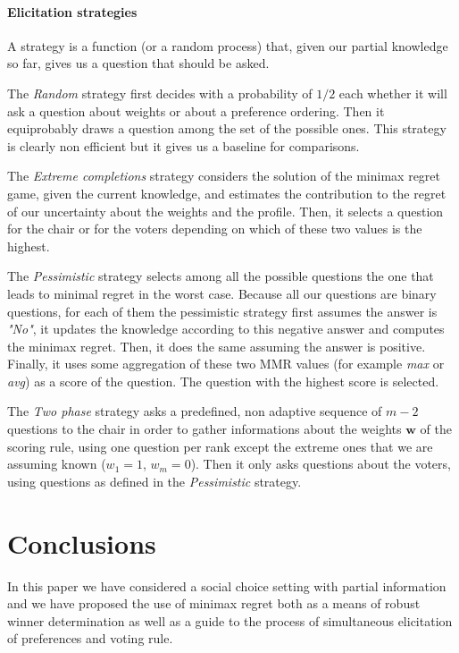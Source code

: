 \documentclass[a4paper,twoside]{article}
\newcommand{\w}{\bm{w}}
\newcommand{\strat}[1]{\emph{#1}}
\begin{document}
\paragraph{Elicitation strategies}
A strategy is a function (or a random process) that, given our partial knowledge so far, gives us a question that should be asked. 

The \strat{Random} strategy first decides with a probability of $1/2$ each whether it will ask a question about weights or about a preference ordering. Then it equiprobably draws a question among the set of the possible ones. This strategy is clearly non efficient but it gives us a baseline for comparisons.

The \strat{Extreme completions} strategy considers the solution of the minimax regret game, given the current knowledge, and estimates the contribution to the regret of our uncertainty about the weights and the profile. Then, it selects a question for the chair or for the voters depending on which of these two values is the highest.

The \strat{Pessimistic} strategy selects among all the possible questions the one that leads to minimal regret in the worst case. Because all our questions are binary questions, for each of them the pessimistic strategy first assumes the answer is \emph{"No"}, it updates the knowledge according to this negative answer and computes the minimax regret. Then, it does the same assuming the answer is positive. Finally, it uses some aggregation of these two MMR values (for example \emph{max} or \emph{avg}) as a score of the question. The question with the highest score is selected.

The \strat{Two phase} strategy asks a predefined, non adaptive sequence of $m-2$ questions to the chair in order to gather informations about the weights $\w$ of the scoring rule, using one question per rank except the extreme ones that we are assuming known ($w_1=1$, $w_m=0$). Then it only asks questions about the voters, using questions as defined in the \strat{Pessimistic} strategy. 

\section{Conclusions}  
\label{sec:conclusions}
In this paper we have considered a social choice setting with partial information and we have proposed the use of minimax regret both as a means of robust winner determination as well as a guide to the process of simultaneous elicitation of preferences and voting rule.
\end{document}
